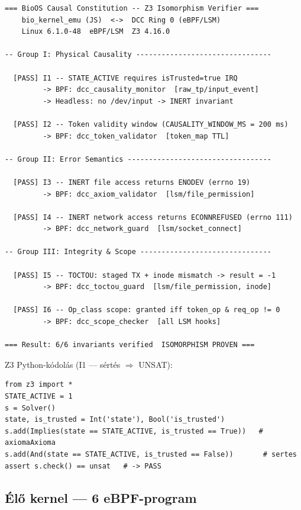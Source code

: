 \documentclass[11pt,a4paper,twoside]{article}
\begin{document}
\begin{lstlisting}[style=shellstyle,caption={Z3-verifikátor kimenete, Z3 4.16.0}]
=== BioOS Causal Constitution -- Z3 Isomorphism Verifier ===
    bio_kernel_emu (JS)  <->  DCC Ring 0 (eBPF/LSM)
    Linux 6.1.0-48  eBPF/LSM  Z3 4.16.0

-- Group I: Physical Causality --------------------------------

  [PASS] I1 -- STATE_ACTIVE requires isTrusted=true IRQ
         -> BPF: dcc_causality_monitor  [raw_tp/input_event]
         -> Headless: no /dev/input -> INERT invariant

  [PASS] I2 -- Token validity window (CAUSALITY_WINDOW_MS = 200 ms)
         -> BPF: dcc_token_validator  [token_map TTL]

-- Group II: Error Semantics ----------------------------------

  [PASS] I3 -- INERT file access returns ENODEV (errno 19)
         -> BPF: dcc_axiom_validator  [lsm/file_permission]

  [PASS] I4 -- INERT network access returns ECONNREFUSED (errno 111)
         -> BPF: dcc_network_guard  [lsm/socket_connect]

-- Group III: Integrity & Scope -------------------------------

  [PASS] I5 -- TOCTOU: staged TX + inode mismatch -> result = -1
         -> BPF: dcc_toctou_guard  [lsm/file_permission, inode]

  [PASS] I6 -- Op_class scope: granted iff token_op & req_op != 0
         -> BPF: dcc_scope_checker  [all LSM hooks]

=== Result: 6/6 invariants verified  ISOMORPHISM PROVEN ===
\end{lstlisting}

\noindent Z3 Python-kódolás (I1 --- sértés $\Rightarrow$ UNSAT):

\begin{lstlisting}[style=pythonstyle]
from z3 import *
STATE_ACTIVE = 1
s = Solver()
state, is_trusted = Int('state'), Bool('is_trusted')
s.add(Implies(state == STATE_ACTIVE, is_trusted == True))   # axiomaAxioma
s.add(And(state == STATE_ACTIVE, is_trusted == False))       # sertes
assert s.check() == unsat   # -> PASS
\end{lstlisting}

\subsection{Élő kernel --- 6 eBPF-program}
\end{document}
